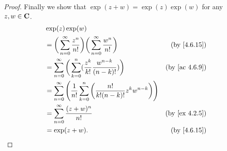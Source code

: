 \begin{proof}
  Finally we show that \(\exp(z + w) = \exp(z) \exp(w)\) for any \(z, w \in \mathbf{C}\).
  \begin{align*}
     & \exp(z) \exp(w)                                                                                                                              \\
     & = \bigg(\sum_{n = 0}^\infty \frac{z^n}{n!}\bigg) \bigg(\sum_{n = 0}^\infty \frac{w^n}{n!}\bigg)                & \text{(by \cref{4.6.15})}   \\
     & = \sum_{n = 0}^\infty \bigg(\sum_{k = 0}^n (\frac{z^k}{k!} \frac{w^{n - k}}{(n - k)!})\bigg)                   & \text{(by \cref{ac 4.6.9})} \\
     & = \sum_{n = 0}^\infty \Bigg(\frac{1}{n!} \sum_{k = 0}^n \bigg(\frac{n!}{k! (n - k)!} z^k w^{n - k}\bigg)\Bigg)                               \\
     & = \sum_{n = 0}^\infty \frac{(z + w)^n}{n!}                                                                     & \text{(by \cref{ex 4.2.5})} \\
     & = \exp(z + w).                                                                                                 & \text{(by \cref{4.6.15})}
  \end{align*}
\end{proof}